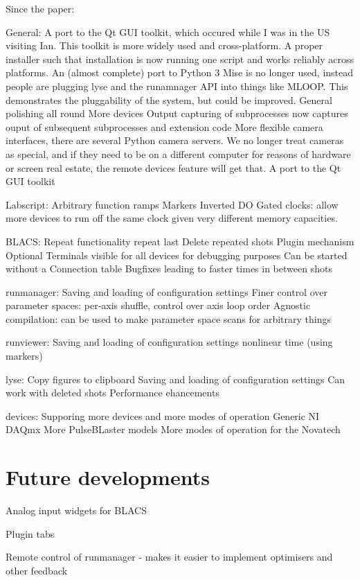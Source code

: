 Since the paper:

General:
A port to the Qt GUI toolkit, which occured while I was in the US visiting Ian. This toolkit is more widely used and cross-platform.
A proper installer such that installation is now running one script and works reliably across platforms.
An (almost complete) port to Python 3
Mise is no longer used, instead people are plugging lyse and the runamnager API into things like MLOOP. This demonstrates the pluggability of the system, but could be improved.
General polishing all round
More devices
Output capturing of subprocesses now captures ouput of subsequent subprocesses and extension code
More flexible camera interfaces, there are several Python camera servers. We no longer treat cameras as special, and if they need to be on a different computer for reasons of hardware or screen real estate, the remote devices feature will get that.
A port to the Qt GUI toolkit

Labscript:
Arbitrary function ramps
Markers
Inverted DO
Gated clocks: allow more devices to run off the same clock given very different memory capacities.

BLACS:
Repeat functionality repeat last
Delete repeated shots
Plugin mechanism
Optional Terminals visible for all devices for debugging purposes
Can be started without a Connection table
Bugfixes leading to faster times in between shots

runmanager:
Saving and loading of configuration settings
Finer control over parameter spaces: per-axis shuffle, control over axis loop order
Agnostic compilation: can be used to make parameter space scans for arbitrary things

runviewer:
Saving and loading of configuration settings
nonlinear time (using markers)

lyse:
Copy figures to clipboard
Saving and loading of configuration settings
Can work with deleted shots
Performance ehancements

devices:
Supporing more devices and more modes of operation
Generic NI DAQmx
More PulseBLaster models
More modes of operation for the Novatech

\section{Future developments}

Analog input widgets for BLACS

Plugin tabs

Remote control of runmanager - makes it easier to implement optimisers and other feedback

